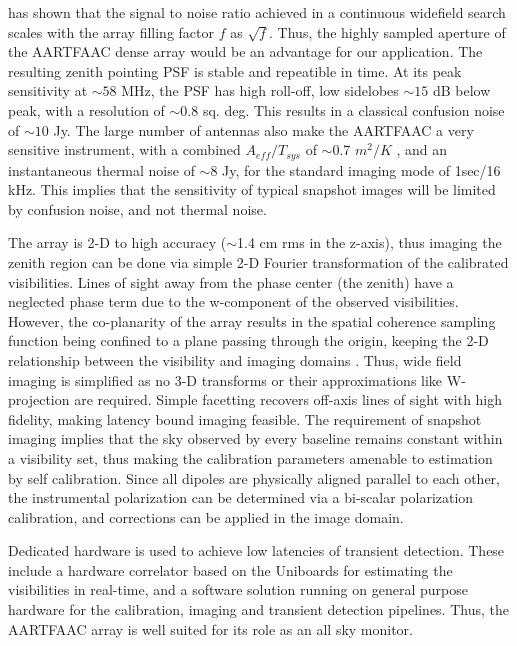 \documentclass{aa}
\begin{document}
\citet{backer1999pers} has  shown that the signal  to noise ratio  achieved in a
continuous  widefield  search  scales  with  the array  filling  factor  $f$  as
$\sqrt{f}$. Thus, the highly sampled  aperture of the AARTFAAC dense array would
be an advantage for our application. The resulting zenith pointing PSF is stable
and repeatible in  time. At its peak sensitivity at $\sim$$58$  MHz, the PSF has
high  roll-off, low sidelobes  $\sim$$15$ dB  below peak,  with a  resolution of
$\sim$$0.8$ sq.  deg.  This results in a classical confusion noise of $\sim$$10$
Jy.   The large  number of  antennas  also make  the AARTFAAC  a very  sensitive
instrument,   with   a  combined   $A_{eff}/T_{sys}$   of  $\sim$0.7   $m^{2}/K$
\citep{wijnholds2011situ}, and an instantaneous thermal noise of $\sim$8 Jy, for
the standard imaging mode of 1sec/16  kHz.  This implies that the sensitivity of
typical  snapshot images will  be limited  by confusion  noise, and  not thermal
noise.

The array is 2-D to high accuracy ($\sim$1.4 cm rms in the z-axis), thus imaging
the zenith  region can be done  via simple \mbox{2-D}  Fourier transformation of
the calibrated  visibilities.  Lines  of sight away  from the phase  center (the
zenith)  have a  neglected phase  term due  to the  w-component of  the observed
visibilities.  However,  the co-planarity  of the array  results in  the spatial
coherence  sampling function  being  confined  to a  plane  passing through  the
origin, keeping the 2-D relationship  between the visibility and imaging domains
\citep{cornwell1992radio}.   Thus, wide field  imaging is  simplified as  no 3-D
transforms  or  their approximations  like  W-projection  are required.   Simple
facetting recovers  off-axis lines of  sight with high fidelity,  making latency
bound imaging feasible. The requirement of  snapshot imaging implies that the sky
observed by every baseline remains constant within a visibility set, thus making
the calibration  parameters amenable to  estimation by self  calibration.  Since
all  dipoles are  physically aligned  parallel to  each other,  the instrumental
polarization  can be determined  via a  bi-scalar polarization  calibration, and
corrections can be applied in the image domain.

Dedicated  hardware is  used to  achieve low  latencies of  transient detection.
These include  a hardware correlator based  on the Uniboards  for estimating the
visibilities in  real-time, and a  software solution running on  general purpose
hardware for  the calibration, imaging and transient  detection pipelines. Thus,
the AARTFAAC array is well suited for its role as an all sky monitor.
\end{document}
